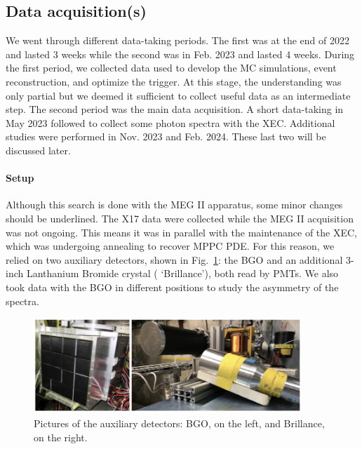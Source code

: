 \begin{refsection}
    \subsection{Data acquisition(s)}
    \label{sec:X17:beamtuning}
        We went through different data-taking periods. 
        The first was at the end of 2022 and lasted 3 weeks while the second was in Feb. 2023 and lasted 4 weeks.
        During the first period, we collected data used to develop the MC simulations, event reconstruction, and optimize the trigger.
        At this stage, the understanding was only partial but we deemed it sufficient to collect useful data as an intermediate step.
        The second period was the main data acquisition. 
        A short data-taking in May 2023 followed to collect some photon spectra with the XEC.
        Additional studies were performed in Nov. 2023 and Feb. 2024.
        These last two will be discussed later.

        \paragraph{Setup} Although this search is done with the MEG II apparatus, some minor changes should be underlined.
        The X17 data were collected while the MEG II acquisition was not ongoing. This means it was in parallel with the maintenance of the XEC, which was undergoing annealing to recover MPPC PDE.
        For this reason, we relied on two auxiliary detectors, shown in Fig.~\ref{fig:X17:Brillance}: the BGO and an additional 3-inch Lanthanium Bromide crystal ( `Brillance'), both read by PMTs.
        We also took data with the BGO in different positions to study the asymmetry of the spectra.

        \begin{figure}
            \centering
            \includegraphics[width = 0.9\textwidth]{Figures/X17/BGOandBrillance.png}
            \caption[X17: Auxiliarly detecotrs]{Pictures of the auxiliary detectors: BGO, on the left, and Brillance, on the right.}
            \label{fig:X17:Brillance}
        \end{figure}
        

\end{refsection}

